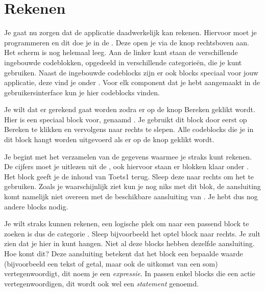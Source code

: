 \section{Rekenen}
Je gaat nu zorgen dat de applicatie daadwerkelijk kan rekenen. Hiervoor moet je programmeren en dit doe je in de . Deze open je via de knop  rechtsboven aan.  Het scherm is nog helemaal leeg. Aan de linker kant staan de verschillende ingebouwde codeblokken, opgedeeld in verschillende categorie\"en, die je kunt gebruiken. Naast de ingebouwde codeblocks zijn er ook blocks speciaal voor jouw applicatie, deze vind je onder . Voor elk component dat je hebt aangemaakt in de gebruikersinterface kun je hier codeblocks vinden.

Je wilt dat er gerekend gaat worden zodra er op de knop Bereken geklikt wordt. Hier is een speciaal block voor, genaamd . Je gebruikt dit block door eerst op Bereken te klikken en vervolgens  naar rechts te slepen. Alle codeblocks die je in dit block hangt worden uitgevoerd als er op de knop geklikt wordt.

Je begint met het verzamelen van de gegevens waarmee je straks kunt rekenen. De cijfers moet je uitlezen uit de , ook hiervoor staan er blokken klaar onder . Het block  geeft je de inhoud van Toets1 terug. Sleep deze naar rechts om het te gebruiken. Zoals je waarschijnlijk ziet kun je nog niks met dit blok, de aansluiting komt namelijk niet overeen met de beschikbare aansluiting van . Je hebt dus nog andere blocks nodig.

Je wilt straks kunnen rekenen, een logische plek om naar een passend block te zoeken is dus de categorie . Sleep bijvoorbeeld het optel block naar rechts. Je zult zien dat je hier  in kunt hangen. Niet al deze blocks hebben dezelfde aansluiting. Hoe komt dit? Deze aansluiting betekent dat het block een bepaalde waarde (bijvoorbeeld een tekst of getal, maar ook de uitkomst van een som) vertegenwoordigt, dit noem je een \emph{expressie}. In  passen enkel blocks die een actie vertegenwoordigen, dit wordt ook wel een \emph{statement} genoemd. 

